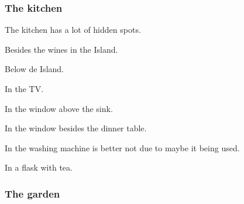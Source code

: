 \subsubsection{The kitchen}

The kitchen has a lot of hidden spots.

Besides the wines in the Island.

Below de Island.

In the TV.

In the window above the sink.

In the window besides the dinner table.

In the washing machine is better not due to maybe it being used.

In a flask with tea.

\subsubsection{The garden}